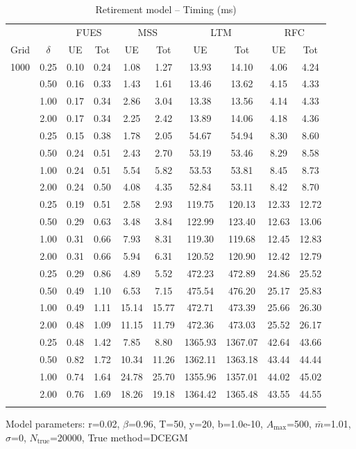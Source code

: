 \documentclass{article}
\begin{document}
\begin{table}[htbp]
\centering
\caption{Retirement model -- Timing (ms)}
\label{tab:timing}
\begin{tabular}{cc|cc|cc|cc|cc}
\toprule
 & & \multicolumn{2}{c|}{FUES} & \multicolumn{2}{c|}{MSS} & \multicolumn{2}{c|}{LTM} & \multicolumn{2}{c}{RFC} \\
Grid & $\delta$ & UE & Tot & UE & Tot & UE & Tot & UE & Tot \\
\midrule
1000 & 0.25 & 0.10 & 0.24 & 1.08 & 1.27 & 13.93 & 14.10 & 4.06 & 4.24 \\
 & 0.50 & 0.16 & 0.33 & 1.43 & 1.61 & 13.46 & 13.62 & 4.15 & 4.33 \\
 & 1.00 & 0.17 & 0.34 & 2.86 & 3.04 & 13.38 & 13.56 & 4.14 & 4.33 \\
 & 2.00 & 0.17 & 0.34 & 2.25 & 2.42 & 13.89 & 14.06 & 4.18 & 4.36 \\
\addlinespace[0.5em]
2000 & 0.25 & 0.15 & 0.38 & 1.78 & 2.05 & 54.67 & 54.94 & 8.30 & 8.60 \\
 & 0.50 & 0.24 & 0.51 & 2.43 & 2.70 & 53.19 & 53.46 & 8.29 & 8.58 \\
 & 1.00 & 0.24 & 0.51 & 5.54 & 5.82 & 53.53 & 53.81 & 8.45 & 8.73 \\
 & 2.00 & 0.24 & 0.50 & 4.08 & 4.35 & 52.84 & 53.11 & 8.42 & 8.70 \\
\addlinespace[0.5em]
3000 & 0.25 & 0.19 & 0.51 & 2.58 & 2.93 & 119.75 & 120.13 & 12.33 & 12.72 \\
 & 0.50 & 0.29 & 0.63 & 3.48 & 3.84 & 122.99 & 123.40 & 12.63 & 13.06 \\
 & 1.00 & 0.31 & 0.66 & 7.93 & 8.31 & 119.30 & 119.68 & 12.45 & 12.83 \\
 & 2.00 & 0.31 & 0.66 & 5.94 & 6.31 & 120.52 & 120.90 & 12.42 & 12.79 \\
\addlinespace[0.5em]
6000 & 0.25 & 0.29 & 0.86 & 4.89 & 5.52 & 472.23 & 472.89 & 24.86 & 25.52 \\
 & 0.50 & 0.49 & 1.10 & 6.53 & 7.15 & 475.54 & 476.20 & 25.17 & 25.83 \\
 & 1.00 & 0.49 & 1.11 & 15.14 & 15.77 & 472.71 & 473.39 & 25.66 & 26.30 \\
 & 2.00 & 0.48 & 1.09 & 11.15 & 11.79 & 472.36 & 473.03 & 25.52 & 26.17 \\
\addlinespace[0.5em]
10000 & 0.25 & 0.48 & 1.42 & 7.85 & 8.80 & 1365.93 & 1367.07 & 42.64 & 43.66 \\
 & 0.50 & 0.82 & 1.72 & 10.34 & 11.26 & 1362.11 & 1363.18 & 43.44 & 44.44 \\
 & 1.00 & 0.74 & 1.64 & 24.78 & 25.70 & 1355.96 & 1357.01 & 44.02 & 45.02 \\
 & 2.00 & 0.76 & 1.69 & 18.26 & 19.18 & 1364.42 & 1365.48 & 43.55 & 44.55 \\
\addlinespace[0.5em]
\bottomrule
\end{tabular}
\vspace{0.5em}
\footnotesize{Model parameters: r=0.02, $\beta$=0.96, T=50, y=20, b=1.0e-10, $A_{\max}$=500, $\bar{m}$=1.01, $\sigma$=0, $N_{\text{true}}$=20000, True method=DCEGM}
\end{table}
\end{document}
